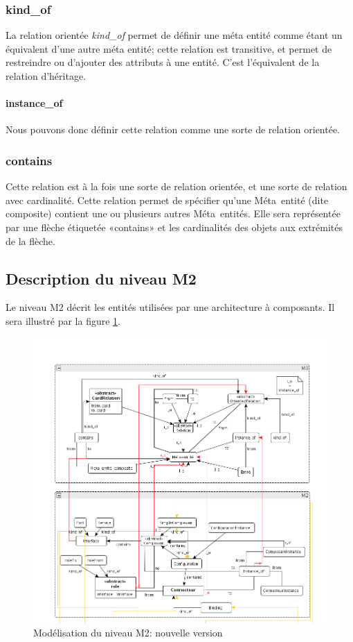 \documentclass[french,a4paper,titlepage]{article}
\begin{document}
			\subsubsection{kind\_of}
			
				La relation orientée \emph{kind\_of} permet de définir une méta entité comme étant un équivalent d'une autre méta entité; cette relation est transitive, et permet de restreindre ou d'ajouter des attributs à une entité. C'est l'équivalent de la relation d'héritage. 
				
				\paragraph{instance\_of} Nous pouvons donc définir cette relation comme une sorte de relation orientée.
				
			\subsubsection{contains}
			
				Cette relation est à la fois une sorte de relation orientée, et une sorte de relation avec cardinalité. Cette relation permet de spécifier qu'une Méta~entité (dite composite) contient une ou plusieurs autres Méta~entités. Elle sera représentée par une flèche étiquetée «contains» et les cardinalités des objets aux extrémités de la flèche.
				
				
		\subsection{Description du niveau M2}
		
			Le niveau M2 décrit les entités utilisées par une architecture à composants. Il sera illustré par la figure \ref{fig:m2-new}.
			
			\begin{figure}[htb]
				\centering
				\includegraphics[width=\textwidth]{m2-new.png}
				\caption{Modélisation du niveau M2: nouvelle version}
				\label{fig:m2-new}
			\end{figure}
		
\end{document}
